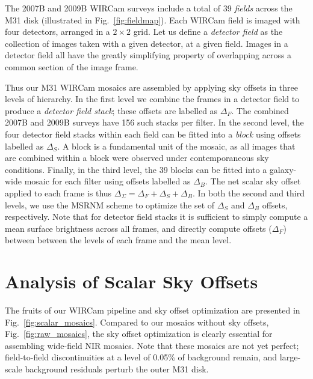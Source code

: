 \documentclass[iop]{emulateapj}
\newcommand{\Fig}[1]{Fig.~\ref{fig:#1}}  %
\begin{document}
The 2007B and 2009B WIRCam surveys include a total of 39 \emph{fields} across the M31 disk (illustrated in \Fig{fieldmap}).
Each WIRCam field is imaged with four detectors, arranged in a $2\times 2$ grid.
Let us define a \emph{detector field} as the collection of images taken with a given detector, at a given field.
Images in a detector field all have the greatly simplifying property of overlapping across a common section of the image frame.

Thus our M31 WIRCam mosaics are assembled by applying sky offsets in three levels of hierarchy.
In the first level we combine the frames in a detector field to produce a \emph{detector field stack}; these offsets are labelled as $\Delta_F$.
The combined 2007B and 2009B surveys have 156 such stacks per filter.
In the second level, the four detector field stacks within each field can be fitted into a \emph{block} using offsets labelled as $\Delta_S$.
A block is a fundamental unit of the mosaic, as all images that are combined within a block were observed under contemporaneous sky conditions.
Finally, in the third level, the 39 blocks can be fitted into a galaxy-wide mosaic for each filter using offsets labelled as $\Delta_B$.
The net scalar sky offset applied to each frame is thus $\Delta_\Sigma = \Delta_F + \Delta_S + \Delta_B$.
In both the second and third levels, we use the MSRNM scheme to optimize the set of $\Delta_S$ and $\Delta_B$ offsets, respectively.
Note that for detector field stacks it is sufficient to simply compute a mean surface brightness across all frames, and directly compute offsets ($\Delta_F$) between between the levels of each frame and the mean level.

\section{Analysis of Scalar Sky Offsets}
\label{sec:scalaranalysis}

The fruits of our WIRCam pipeline and sky offset optimization are presented in \Fig{scalar_mosaics}.
Compared to our mosaics without sky offsets, \Fig{raw_mosaics}, the sky offset optimization is clearly essential for assembling wide-field NIR mosaics.
Note that these mosaics are not yet perfect; field-to-field discontinuities at a level of 0.05\% of background remain, and large-scale background residuals perturb the outer M31 disk.
\end{document}
